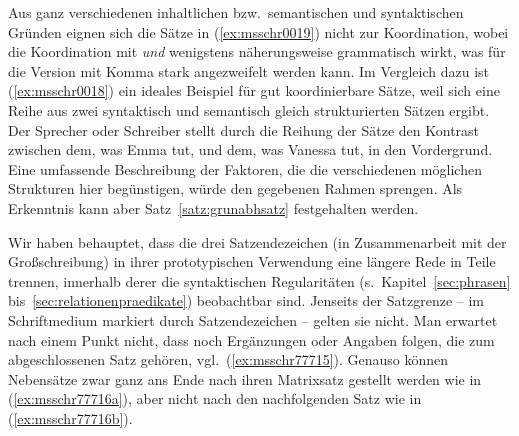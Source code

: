 \begin{exe}
  \ex\label{ex:msschr0019} 
  \begin{xlist}
  \end{xlist}
\end{exe}

Aus ganz verschiedenen inhaltlichen bzw.\ semantischen und syntaktischen Gründen eignen sich die Sätze in (\ref{ex:msschr0019}) nicht zur Koordination, wobei die Koordination mit \textit{und} wenigstens näherungsweise grammatisch wirkt, was für die Version mit Komma stark angezweifelt werden kann.
Im Vergleich dazu ist (\ref{ex:msschr0018}) ein ideales Beispiel für gut koordinierbare Sätze, weil sich eine Reihe aus zwei syntaktisch und semantisch gleich strukturierten Sätzen ergibt.
Der Sprecher oder Schreiber stellt durch die Reihung der Sätze den Kontrast zwischen dem, was Emma tut, und dem, was Vanessa tut, in den Vordergrund.
Eine umfassende Beschreibung der Faktoren, die die verschiedenen möglichen Strukturen hier begünstigen, würde den gegebenen Rahmen sprengen.
Als Erkenntnis kann aber Satz~\ref{satz:grunabhsatz} festgehalten werden.


Wir haben behauptet, dass die drei Satzendezeichen (in Zusammenarbeit mit der Großschreibung) in ihrer prototypischen Verwendung eine längere Rede in Teile trennen, innerhalb derer die syntaktischen Regularitäten (s.\ Kapitel~\ref{sec:phrasen} bis~\ref{sec:relationenpraedikate}) beobachtbar sind.
Jenseits der Satzgrenze -- im Schriftmedium markiert durch Satzendezeichen -- gelten sie nicht.
Man erwartet \zB nach einem Punkt nicht, dass noch Ergänzungen oder Angaben folgen, die zum abgeschlossenen Satz gehören, vgl.\ (\ref{ex:msschr77715}).
Genauso können Nebensätze zwar ganz ans Ende nach ihren Matrixsatz gestellt werden wie in (\ref{ex:msschr77716a}), aber nicht nach den nachfolgenden Satz wie in (\ref{ex:msschr77716b}).

\begin{exe}
  \ex\label{ex:msschr77716}
  \begin{xlist}
  \end{xlist}
\end{exe}

